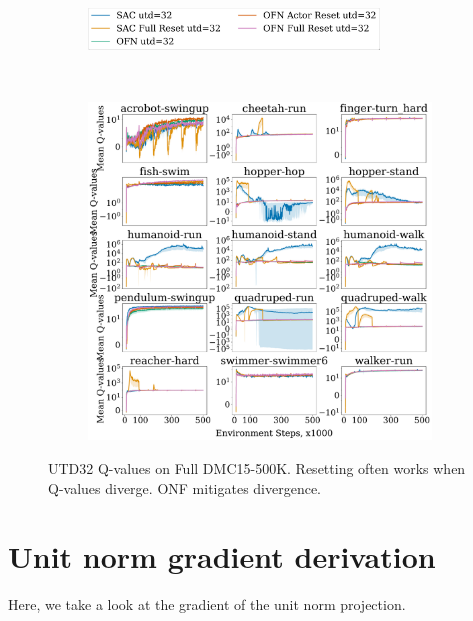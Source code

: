 \begin{figure}[H]
\centering
    \begin{subfigure}[b]{0.8\textwidth}
        \centering
        \includegraphics[height=1.1cm]{figures/dissecting/main_exp/utd_32_Q_legend.pdf}
    \end{subfigure}\\%
    \begin{subfigure}[b]{1\textwidth}
        \centering
        \includegraphics[width=15cm, trim=0cm 0cm 0cm 0cm ,clip]{figures/dissecting/main_exp/utd_32_Q.pdf}
    \end{subfigure}%
    \caption{UTD32 Q-values on Full DMC15-500K. Resetting often works when Q-values diverge. ONF mitigates divergence.}
    \label{fig:utd32_Q}
\end{figure}


\section{Unit norm gradient derivation} \label{app:unitnorm}

Here, we take a look at the gradient of the unit norm projection.

